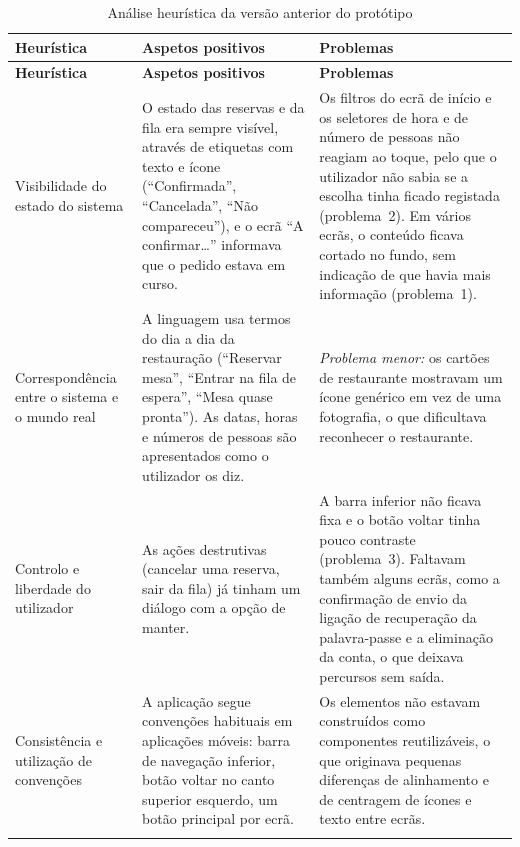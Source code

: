 {\small
\begin{longtable}{>{\raggedright\arraybackslash}p{3cm}
                  >{\raggedright\arraybackslash}p{5.6cm}
                  >{\raggedright\arraybackslash}p{5.6cm}}
  \caption{Análise heurística da versão anterior do protótipo}\label{tab:heuristicas}\\
  \toprule
  \textbf{Heurística} & \textbf{Aspetos positivos} & \textbf{Problemas} \\
  \midrule
  \endfirsthead
  \toprule
  \textbf{Heurística} & \textbf{Aspetos positivos} & \textbf{Problemas} \\
  \midrule
  \endhead
  \bottomrule
  \endfoot

  Visibilidade do estado do sistema
  & O estado das reservas e da fila era sempre visível, através de etiquetas com texto e ícone
    (``Confirmada'', ``Cancelada'', ``Não compareceu''), e o ecrã ``A confirmar\ldots''
    informava que o pedido estava em curso.
  & Os filtros do ecrã de início e os seletores de hora e de número de pessoas não reagiam ao
    toque, pelo que o utilizador não sabia se a escolha tinha ficado registada (problema~2).
    Em vários ecrãs, o conteúdo ficava cortado no fundo, sem indicação de que havia mais
    informação (problema~1). \\
  \addlinespace

  Correspondência entre o sistema e o mundo real
  & A linguagem usa termos do dia a dia da restauração (``Reservar mesa'', ``Entrar na fila de
    espera'', ``Mesa quase pronta''). As datas, horas e números de pessoas são apresentados
    como o utilizador os diz.
  & \emph{Problema menor:} os cartões de restaurante mostravam um ícone genérico em vez de uma
    fotografia, o que dificultava reconhecer o restaurante. \\
  \addlinespace

  Controlo e liberdade do utilizador
  & As ações destrutivas (cancelar uma reserva, sair da fila) já tinham um diálogo com a opção
    de manter.
  & A barra inferior não ficava fixa e o botão voltar tinha pouco contraste (problema~3).
    Faltavam também alguns ecrãs, como a confirmação de envio da ligação de recuperação da
    palavra-passe e a eliminação da conta, o que deixava percursos sem saída. \\
  \addlinespace

  Consistência e utilização de convenções
  & A aplicação segue convenções habituais em aplicações móveis: barra de navegação inferior,
    botão voltar no canto superior esquerdo, um botão principal por ecrã.
  & Os elementos não estavam construídos como componentes reutilizáveis, o que originava
    pequenas diferenças de alinhamento e de centragem de ícones e texto entre ecrãs. \\
  \addlinespace


\end{longtable}}
